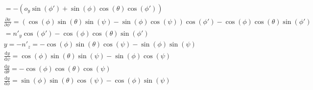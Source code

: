 \documentclass[a4paper,10pt]{article}
\begin{document}
\begin{eqnarray}
	&= -\left(o_y \sin\left(\phi'\right) + \sin\left(\phi\right)\cos\left(\theta\right)\cos\left(\phi'\right) \right) \\
	& \frac{\partial x}{\partial \phi'} = \left(\cos \left(\phi\right) \sin \left(\theta\right) \sin \left(\psi\right) -\sin \left(\phi\right) \cos \left(\psi\right) \right)\cos\left(\phi' \right) - \cos\left(\phi\right) \cos\left(\theta\right) \sin\left(\phi'\right) \nonumber \\
	&= n'_y \cos\left(\phi'\right) - \cos\left(\phi\right) \cos\left(\theta\right) \sin\left(\phi'\right)\\
	&y = -n'_z = -\cos \left(\phi\right) \sin \left(\theta\right) \cos \left(\psi\right) - \sin \left(\phi\right) \sin \left(\psi\right)\\
	&\frac{\mathrm{d} y}{\mathrm{d} \psi} = \cos \left(\phi\right) \sin \left(\theta\right) \sin \left(\psi\right) - \sin \left(\phi\right) \cos \left(\psi\right)\\
	&\frac{\mathrm{d} y}{\mathrm{d} \theta} = -\cos \left(\phi\right) \cos \left(\theta\right) \cos \left(\psi\right)\\
	&\frac{\mathrm{d} y}{\mathrm{d} \phi} = \sin \left(\phi\right) \sin \left(\theta\right) \cos \left(\psi\right) - \cos \left(\phi\right) \sin \left(\psi\right)\\
\end{eqnarray}
\end{document}
